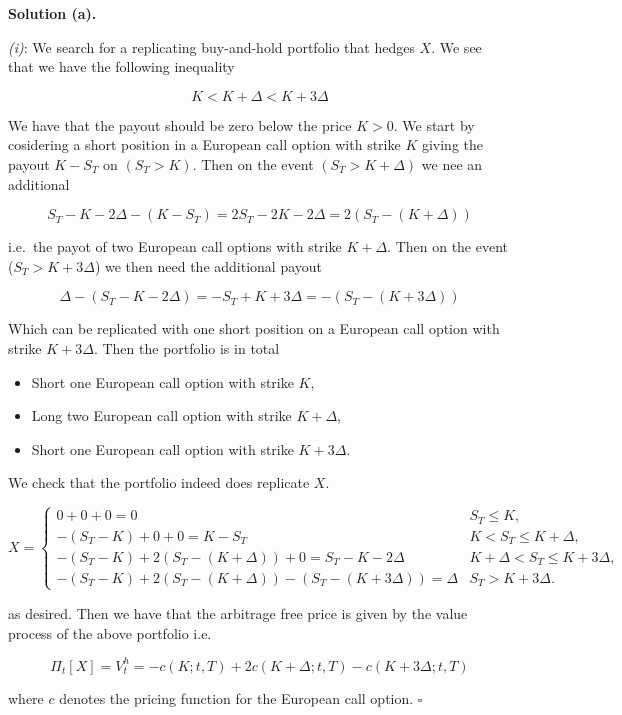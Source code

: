 \documentclass[a4paper,12pt,openany]{book}
\providecommand{\tightlist}{%
 \setlength{\itemsep}{0pt}\setlength{\parskip}{0pt}}
\begin{document}
\noindent\makebox[\linewidth]{\rule{\textwidth}{0.4pt}}

\textbf{Solution (a).}

\emph{(i)}: We search for a replicating buy-and-hold portfolio that hedges \(X\). We see that we have the following inequality

\[
K<K+\Delta<K+3\Delta
\]

We have that the payout should be zero below the price \(K>0\). We start by cosidering a short position in a European call option with strike \(K\) giving the payout \(K-S_T\) on \((S_T>K)\). Then on the event \((S_T>K+\Delta)\) we nee an additional

\[
S_T-K-2\Delta-(K-S_T)=2S_T-2K-2\Delta=2(S_T-(K+\Delta))
\]

i.e.~the payot of two European call options with strike \(K+\Delta\). Then on the event (\(S_T>K+3\Delta\)) we then need the additional payout

\[
\Delta-(S_T-K-2\Delta)=-S_T+K+3\Delta=-(S_T-(K+3\Delta))
\]

Which can be replicated with one short position on a European call option with strike \(K+3\Delta\). Then the portfolio is in total

\begin{itemize}
\tightlist
\item
  Short one European call option with strike \(K\),
\item
  Long two European call option with strike \(K+\Delta\),
\item
  Short one European call option with strike \(K+3\Delta\).
\end{itemize}

We check that the portfolio indeed does replicate \(X\).

\[
X=\begin{cases}
0+0+0=0 & S_T\le K,\\
-(S_T-K)+0+0=K-S_T & K<S_T\le K+\Delta,\\
-(S_T-K) +2(S_T-(K+\Delta)) + 0 = S_T-K-2\Delta & K+\Delta < S_T \le K + 3\Delta,\\
-(S_T-K) +2(S_T-(K+\Delta)) - (S_T-(K+3\Delta))= \Delta& S_T>K+3\Delta.
\end{cases}
\]

as desired. Then we have that the arbitrage free price is given by the value process of the above portfolio i.e.

\[
\Pi_t[X]=V_t^h=-c(K;t,T)+2c(K+\Delta;t,T)-c(K+3\Delta;t,T)
\]

where \(c\) denotes the pricing function for the European call option. \(\square\)
\end{document}
